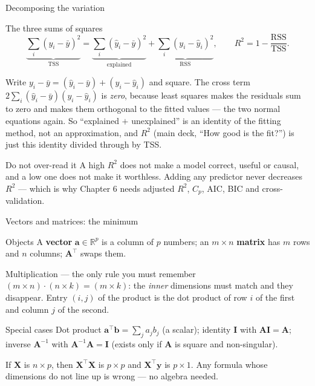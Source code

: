\documentclass[aspectratio=169,11pt]{beamer}
\begin{document}
\begin{frame}{Decomposing the variation}
  \footnotesize
  \begin{block}{The three sums of squares}
    \[
      \underbrace{\sum_i (y_i - \bar y)^2}_{\mathrm{TSS}}
      = \underbrace{\sum_i (\hat y_i - \bar y)^2}_{\text{explained}}
      + \underbrace{\sum_i (y_i - \hat y_i)^2}_{\mathrm{RSS}},
      \qquad
      R^2 = 1 - \frac{\mathrm{RSS}}{\mathrm{TSS}} .
    \]
  \end{block}
  \begin{readme}
    Write $y_i - \bar y = (\hat y_i - \bar y) + (y_i - \hat y_i)$ and square.
    The cross term $2\sum_i (\hat y_i - \bar y)(y_i - \hat y_i)$ is
    \emph{zero}, because least squares makes the residuals sum to zero and
    makes them orthogonal to the fitted values --- the two normal equations
    again. So ``explained $+$ unexplained'' is an identity of the fitting
    method, not an approximation, and $R^2$ (main deck, ``How good is the
    fit?'') is just this identity divided through by TSS.
  \end{readme}
  \begin{alertblock}{Do not over-read it}
    A high $R^2$ does not make a model correct, useful or causal, and a low
    one does not make it worthless. Adding any predictor never decreases
    $R^2$ --- which is why Chapter 6 needs adjusted $R^2$, $C_p$, AIC, BIC and
    cross-validation.
  \end{alertblock}
\end{frame}

\begin{frame}{Vectors and matrices: the minimum}
  \footnotesize
  \begin{block}{Objects}
    A \textbf{vector} $\mathbf{a} \in \mathbb{R}^p$ is a column of $p$
    numbers; an $m \times n$ \textbf{matrix} has $m$ rows and $n$ columns;
    $\mathbf{A}^\top$ swaps them.
  \end{block}
  \begin{block}{Multiplication --- the only rule you must remember}
    $(m \times n)\cdot(n \times k) = (m \times k)$: the \emph{inner}
    dimensions must match and they disappear. Entry $(i,j)$ of the product is
    the dot product of row $i$ of the first and column $j$ of the second.
  \end{block}
  \begin{block}{Special cases}
    Dot product $\mathbf{a}^\top\mathbf{b} = \sum_j a_j b_j$ (a scalar);
    identity $\mathbf{I}$ with $\mathbf{A}\mathbf{I} = \mathbf{A}$;
    inverse $\mathbf{A}^{-1}$ with $\mathbf{A}^{-1}\mathbf{A} = \mathbf{I}$
    (exists only if $\mathbf{A}$ is square and non-singular).
  \end{block}
  \begin{takeaway}
    If $\mathbf{X}$ is $n \times p$, then $\mathbf{X}^\top\mathbf{X}$ is
    $p \times p$ and $\mathbf{X}^\top\mathbf{y}$ is $p \times 1$. Any formula
    whose dimensions do not line up is wrong --- no algebra needed.
  \end{takeaway}
\end{frame}
\end{document}
